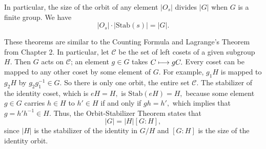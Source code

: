 In particular, the size of the orbit of any element $|O_s|$ divides $|G|$ when $G$ is a finite group. We have 
\[
|O_s|\cdot|\text{Stab}(s)| = |G|.
\]

These theorems are similar to the Counting Formula and Lagrange's Theorem from Chapter 2. In particular, let $\mathcal{C}$ be the set of left cosets of a given subgroup $H.$ Then $G$ acts on $\mathcal{C}$; an element $g \in G$ takes $C \longmapsto gC.$ Every coset can be mapped to any other coset by some element of $G.$ For example, $g_1H$ is mapped to $g_2H$ by $g_2g_1^{-1}\in G.$ So there is only one orbit, the entire set $\mathcal{C}$. The stabilizer of the identity coset, which is $eH = H,$ is $\text{Stab}(eH) = H,$ because some element $g \in G$ carries $h \in H$ to $h' \in H$ if and only if $gh = h',$ which implies that $g = h'h^{-1} \in H.$ Thus, the Orbit-Stabilizer Theorem states that 
\[
|G| = |H|[G:H],
\]
since $|H|$ is the stabilizer of the identity in $G/H$ and $[G:H]$ is the size of the identity orbit.


